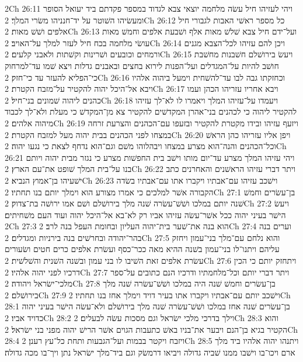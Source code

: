 2Ch 26:11  ויהי לעזיהו חיל עשׂה מלחמה יוצאי צבא לגדוד במספר פקדתם ביד יעואל הסופר ומעשׂיהו השׁוטר על יד־חנניהו משׂרי המלך׃
2Ch 26:12  כל מספר ראשׁי האבות לגבורי חיל אלפים ושׁשׁ מאות׃
2Ch 26:13  ועל־ידם חיל צבא שׁלשׁ מאות אלף ושׁבעת אלפים וחמשׁ מאות עושׂי מלחמה בכח חיל לעזר למלך על־האויב׃
2Ch 26:14  ויכן להם עזיהו לכל־הצבא מגנים ורמחים וכובעים ושׁרינות וקשׁתות ולאבני קלעים׃
2Ch 26:15  ויעשׂ בירושׁלם חשׁבנות מחשׁבת חושׁב להיות על־המגדלים ועל־הפנות לירוא בחצים ובאבנים גדלות ויצא שׁמו עד־למרחוק כי־הפליא להעזר עד כי־חזק׃
2Ch 26:16  וכחזקתו גבה לבו עד־להשׁחית וימעל ביהוה אלהיו ויבא אל־היכל יהוה להקטיר על־מזבח הקטרת׃
2Ch 26:17  ויבא אחריו עזריהו הכהן ועמו כהנים ליהוה שׁמונים בני־חיל׃
2Ch 26:18  ויעמדו על־עזיהו המלך ויאמרו לו לא־לך עזיהו להקטיר ליהוה כי לכהנים בני־אהרן המקדשׁים להקטיר צא מן־המקדשׁ כי מעלת ולא־לך לכבוד מיהוה אלהים׃
2Ch 26:19  ויזעף עזיהו ובידו מקטרת להקטיר ובזעפו עם־הכהנים והצרעת זרחה במצחו לפני הכהנים בבית יהוה מעל למזבח הקטרת׃
2Ch 26:20  ויפן אליו עזריהו כהן הראשׁ וכל־הכהנים והנה־הוא מצרע במצחו ויבהלוהו משׁם וגם־הוא נדחף לצאת כי נגעו יהוה׃
2Ch 26:21  ויהי עזיהו המלך מצרע עד־יום מותו וישׁב בית החפשׁות מצרע כי נגזר מבית יהוה ויותם בנו על־בית המלך שׁופט את־עם הארץ׃
2Ch 26:22  ויתר דברי עזיהו הראשׁנים והאחרנים כתב ישׁעיהו בן־אמוץ הנביא׃
2Ch 26:23  וישׁכב עזיהו עם־אבתיו ויקברו אתו עם־אבתיו בשׂדה הקבורה אשׁר למלכים כי אמרו מצורע הוא וימלך יותם בנו תחתיו׃
2Ch 27:1  בן־עשׂרים וחמשׁ שׁנה יותם במלכו ושׁשׁ־עשׂרה שׁנה מלך בירושׁלם ושׁם אמו ירושׁה בת־צדוק׃
2Ch 27:2  ויעשׂ הישׁר בעיני יהוה ככל אשׁר־עשׂה עזיהו אביו רק לא־בא אל־היכל יהוה ועוד העם משׁחיתים׃
2Ch 27:3  הוא בנה את־שׁער בית־יהוה העליון ובחומת העפל בנה לרב׃
2Ch 27:4  וערים בנה בהר־יהודה ובחרשׁים בנה בירניות ומגדלים׃
2Ch 27:5  והוא נלחם עם־מלך בני־עמון ויחזק עליהם ויתנו־לו בני־עמון בשׁנה ההיא מאה ככר־כסף ועשׂרת אלפים כרים חטים ושׂעורים עשׂרת אלפים זאת השׁיבו לו בני עמון ובשׁנה השׁנית והשׁלשׁית׃
2Ch 27:6  ויתחזק יותם כי הכין דרכיו לפני יהוה אלהיו׃
2Ch 27:7  ויתר דברי יותם וכל־מלחמתיו ודרכיו הנם כתובים על־ספר מלכי־ישׂראל ויהודה׃
2Ch 27:8  בן־עשׂרים וחמשׁ שׁנה היה במלכו ושׁשׁ־עשׂרה שׁנה מלך בירושׁלם׃
2Ch 27:9  וישׁכב יותם עם־אבתיו ויקברו אתו בעיר דויד וימלך אחז בנו תחתיו׃
2Ch 28:1  בן־עשׂרים שׁנה אחז במלכו ושׁשׁ־עשׂרה שׁנה מלך בירושׁלם ולא־עשׂה הישׁר בעיני יהוה כדויד אביו׃
2Ch 28:2  וילך בדרכי מלכי ישׂראל וגם מסכות עשׂה לבעלים׃
2Ch 28:3  והוא הקטיר בגיא בן־הנם ויבער את־בניו באשׁ כתעבות הגוים אשׁר הרישׁ יהוה מפני בני ישׂראל׃
2Ch 28:4  ויזבח ויקטר בבמות ועל־הגבעות ותחת כל־עץ רענן׃
2Ch 28:5  ויתנהו יהוה אלהיו ביד מלך ארם ויכו־בו וישׁבו ממנו שׁביה גדולה ויביאו דרמשׂק וגם ביד־מלך ישׂראל נתן ויך־בו מכה גדולה׃
